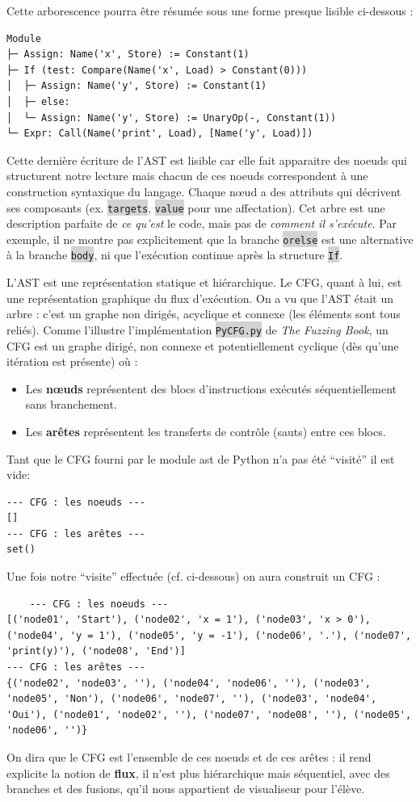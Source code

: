 \documentclass[11pt,a4paper]{article}
\newcommand{\code}[1]{\colorbox{lightgray}{\texttt{\small #1}}}
\begin{document}
Cette arborescence pourra être résumée sous une forme presque lisible ci-dessous :
\begin{verbatim}
Module
├─ Assign: Name('x', Store) := Constant(1)
├─ If (test: Compare(Name('x', Load) > Constant(0)))
│  ├─ Assign: Name('y', Store) := Constant(1)
│  ├─ else:
│  └─ Assign: Name('y', Store) := UnaryOp(-, Constant(1))
└─ Expr: Call(Name('print', Load), [Name('y', Load)])
\end{verbatim}
Cette dernière écriture de l'AST est lisible car elle fait apparaitre des noeuds qui structurent notre lecture mais chacun de ces noeuds correspondent à une construction syntaxique du langage. Chaque nœud a des attributs qui décrivent ses composants (ex. \code{targets}, \code{value} pour une affectation). Cet arbre est une description parfaite de \textit{ce qu'est} le code, mais pas de \textit{comment il s'exécute}. Par exemple, il ne montre pas explicitement que la branche \code{orelse} est une alternative à la branche \code{body}, ni que l'exécution continue après la structure \code{If}. \par  L'AST est une représentation statique et hiérarchique. Le CFG, quant à lui, est une représentation graphique du flux d'exécution. On a vu que l'AST était un arbre : c'est un graphe non dirigés, acyclique et connexe (les éléments sont tous reliés). Comme l'illustre l'implémentation \code{PyCFG.py} de \textit{The Fuzzing Book}, un CFG est un graphe dirigé, non connexe et potentiellement cyclique (dès qu'une itération est présente) où :
\begin{itemize}
    \item Les \textbf{nœuds} représentent des blocs d'instructions exécutés séquentiellement sans branchement.
    \item Les \textbf{arêtes} représentent les transferts de contrôle (sauts) entre ces blocs.
\end{itemize}
Tant que le CFG fourni par le module ast de Python n'a pas été ``visité'' il est vide:
\begin{verbatim}
--- CFG : les noeuds ---
[]
--- CFG : les arêtes ---
set()
\end{verbatim}
Une fois notre ``visite'' effectuée (cf. ci-dessous) on aura construit un CFG :
\begin{verbatim}
    --- CFG : les noeuds ---
[('node01', 'Start'), ('node02', 'x = 1'), ('node03', 'x > 0'), ('node04', 'y = 1'), ('node05', 'y = -1'), ('node06', '.'), ('node07', 'print(y)'), ('node08', 'End')]
--- CFG : les arêtes ---
{('node02', 'node03', ''), ('node04', 'node06', ''), ('node03', 'node05', 'Non'), ('node06', 'node07', ''), ('node03', 'node04', 'Oui'), ('node01', 'node02', ''), ('node07', 'node08', ''), ('node05', 'node06', '')}
\end{verbatim}
On dira que le CFG est l'ensemble de ces noeuds et de ces arêtes : il rend explicite la notion de \textbf{flux}, il n'est plus hiérarchique mais séquentiel, avec des branches et des fusions, qu'il nous appartient de visualiseur pour l'élève.
\end{document}
